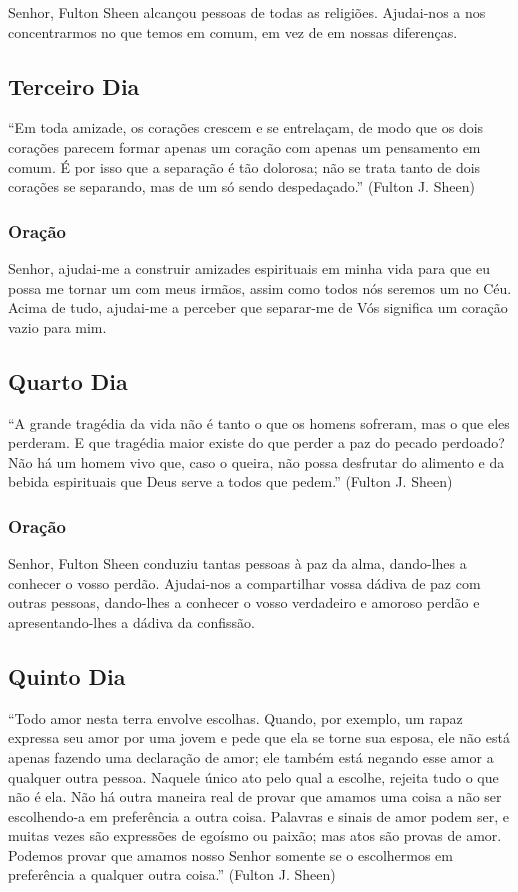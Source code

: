 \documentclass[11pt]{article}
\begin{document}
Senhor, Fulton Sheen alcançou pessoas de todas as religiões. Ajudai-nos a nos concentrarmos no que temos em comum, em vez de em nossas diferenças.

\textbf{}


\subsection{Terceiro Dia}
“Em toda amizade, os corações crescem e se entrelaçam, de modo que os dois corações parecem formar apenas um coração com apenas um pensamento em comum. É por isso que a separação é tão dolorosa; não se trata tanto de dois corações se separando, mas de um só sendo despedaçado.” (Fulton J. Sheen)

\subsubsection{Oração}
Senhor, ajudai-me a construir amizades espirituais em minha vida para que eu possa me tornar um com meus irmãos, assim como todos nós seremos um no Céu. Acima de tudo, ajudai-me a perceber que separar-me de Vós significa um coração vazio para mim.

\textbf{}


\subsection{Quarto Dia}
“A grande tragédia da vida não é tanto o que os homens sofreram, mas o que eles perderam. E que tragédia maior existe do que perder a paz do pecado perdoado? Não há um homem vivo que, caso o queira, não possa desfrutar do alimento e da bebida espirituais que Deus serve a todos que pedem.” (Fulton J. Sheen)

\subsubsection{Oração}

Senhor, Fulton Sheen conduziu tantas pessoas à paz da alma, dando-lhes a conhecer o vosso perdão. Ajudai-nos a compartilhar vossa dádiva de paz com outras pessoas, dando-lhes a conhecer o vosso verdadeiro e amoroso perdão e apresentando-lhes a dádiva da confissão.

\textbf{}


\subsection{Quinto Dia}
“Todo amor nesta terra envolve escolhas. Quando, por exemplo, um rapaz expressa seu amor por uma jovem e pede que ela se torne sua esposa, ele não está apenas fazendo uma declaração de amor; ele também está negando esse amor a qualquer outra pessoa. Naquele único ato pelo qual a escolhe, rejeita tudo o que não é ela. Não há outra maneira real de provar que amamos uma coisa a não ser escolhendo-a em preferência a outra coisa. Palavras e sinais de amor podem ser, e muitas vezes são expressões de egoísmo ou paixão; mas atos são provas de amor. Podemos provar que amamos nosso Senhor somente se o escolhermos em preferência a qualquer outra coisa.” (Fulton J. Sheen)
\end{document}
